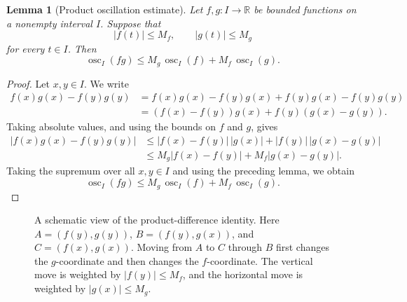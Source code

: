 \documentclass[11pt]{article}
\newcommand{\R}{\mathbb{R}}
\DeclareMathOperator{\osc}{osc}
\theoremstyle{plain}
\newtheorem{lemma}{Lemma}
\theoremstyle{remark}
\begin{document}
\begin{lemma}[Product oscillation estimate]
Let $f,g:I\to\R$ be bounded functions on a nonempty interval $I$. Suppose that
\[
    |f(t)|\leq M_f,
    \qquad
    |g(t)|\leq M_g
\]
for every $t\in I$. Then
\[
    \osc_I(fg)
    \leq
    M_g\,\osc_I(f)+M_f\,\osc_I(g).
\]
\end{lemma}

\begin{proof}
Let $x,y\in I$. We write
\begin{align*}
    f(x)g(x)-f(y)g(y)
    &=f(x)g(x)-f(y)g(x)+f(y)g(x)-f(y)g(y)\\
    &=(f(x)-f(y))g(x)+f(y)(g(x)-g(y)).
\end{align*}
Taking absolute values, and using the bounds on $f$ and $g$, gives
\begin{align*}
    |f(x)g(x)-f(y)g(y)|
    &\leq |f(x)-f(y)|\,|g(x)|+|f(y)|\,|g(x)-g(y)|\\
    &\leq M_g|f(x)-f(y)|+M_f|g(x)-g(y)|.
\end{align*}
Taking the supremum over all $x,y\in I$ and using the preceding lemma, we obtain
\[
    \osc_I(fg)
    \leq
    M_g\,\osc_I(f)+M_f\,\osc_I(g).
\]
\end{proof}

\begin{figure}[h]
\centering
{}

\caption{A schematic view of the product-difference identity. Here $A=(f(y),g(y))$, $B=(f(y),g(x))$, and $C=(f(x),g(x))$. Moving from $A$ to $C$ through $B$ first changes the $g$-coordinate and then changes the $f$-coordinate. The vertical move is weighted by $|f(y)|\leq M_f$, and the horizontal move is weighted by $|g(x)|\leq M_g$.}
\end{figure}
\end{document}
